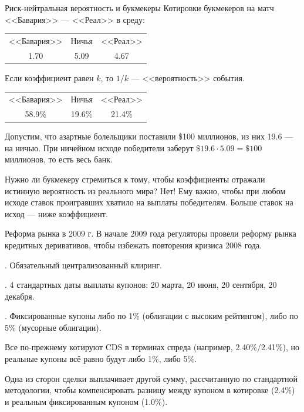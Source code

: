\documentclass{beamer}
\begin{document}
\begin{frame}{Риск-нейтральная вероятность и букмекеры}
\justify
Котировки букмекеров на матч <<Бавария>> --- <<Реал>> в среду:

\centering
\begin{tabular}{c|c|c}
<<Бавария>> & Ничья & <<Реал>> \\
1.70 & 5.09 & 4.67
\end{tabular}

\justify
Если коэффициент равен $k$, то $1/k$ --- <<вероятность>> события.

\centering
\begin{tabular}{c|c|c}
<<Бавария>> & Ничья & <<Реал>> \\
58.9\% & 19.6\% & 21.4\%
\end{tabular}

\justify
Допустим, что азартные болельщики поставили \$100 миллионов, из них 19.6 --- на ничью. При 
ничейном исходе победители заберут $\$19.6 \cdot 5.09 = \$100$ миллионов, то 
есть весь банк.

\justify
Нужно ли букмекеру стремиться к тому, чтобы коэффициенты отражали истинную вероятность из реального мира? Нет! Ему важно, чтобы при любом исходе ставок проигравших хватило на выплаты победителям. Больше ставок на исход --- ниже коэффициент.
\end{frame}



\begin{frame}{Реформа рынка в 2009 г.}
\justify
В начале 2009 года регуляторы провели реформу рынка кредитных деривативов, чтобы избежать повторения кризиса 2008 года.

. Обязательный централизованный клиринг.

. 4 стандартных даты выплаты купонов: 20 марта, 20 июня, 20 сентября, 20 декабря.

. Фиксированные купоны либо по 1\% (облигации с высоким рейтингом), либо по 5\% (мусорные облигации).

\justify
Все по-прежнему котируют CDS в терминах спреда (например, 2.40\%/2.41\%), но реальные купоны всё равно будут либо 1\%, либо 5\%.

\justify
Одна из сторон сделки выплачивает другой сумму, рассчитанную по стандартной методологии, чтобы компенсировать разницу между купоном в котировке (2.4\%) и реальным фиксированным купоном (1.0\%).
\end{frame}
\end{document}
